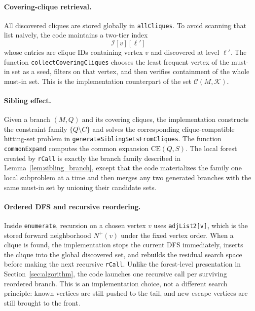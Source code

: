 \documentclass[sigconf, nonacm]{acmart}
\theoremstyle{definition}
\theoremstyle{remark}
\begin{document}
\paragraph{Covering-clique retrieval.}
All discovered cliques are stored globally in \texttt{allCliques}.  To avoid
scanning that list naively, the code maintains a two-tier index
\[
  \mathcal{I}[v][\ell']
\]
whose entries are clique IDs containing vertex $v$ and discovered at level
$\ell'$.  The function \texttt{collectCoveringCliques} chooses the least
frequent vertex of the must-in set as a seed, filters on that vertex, and then
verifies containment of the whole must-in set.  This is the implementation
counterpart of the set $\mathcal{C}(M,\mathcal{K})$.

\paragraph{Sibling effect.}
Given a branch $(M,Q)$ and its covering cliques, the implementation constructs
the constraint family $\{Q \setminus C\}$ and solves the corresponding
clique-compatible hitting-set problem in
\texttt{generateSiblingSetsFromCliques}.  The function
\texttt{commonExpand} computes the common expansion
$\mathrm{CE}(Q,S)$.  The local forest created by \texttt{rCall} is exactly the
branch family described in Lemma~\ref{lem:sibling_branch}, except that the code
materializes the family one local subproblem at a time and then merges any two
generated branches with the same must-in set by unioning their candidate sets.

\paragraph{Ordered DFS and recursive reordering.}
Inside \texttt{enumerate}, recursion on a chosen vertex $v$ uses
\texttt{adjList2[v]}, which is the stored forward neighborhood $N^+(v)$ under
the fixed vertex order.  When a clique is found, the implementation stops the
current DFS immediately, inserts the clique into the global discovered set, and
rebuilds the residual search space before making the next recursive
\texttt{rCall}.  Unlike the forest-level presentation in
Section~\ref{sec:algorithm}, the code launches one recursive call per surviving
reordered branch.  This is an implementation choice, not a different search
principle: known vertices are still pushed to the tail, and new escape vertices
are still brought to the front.
\end{document}

